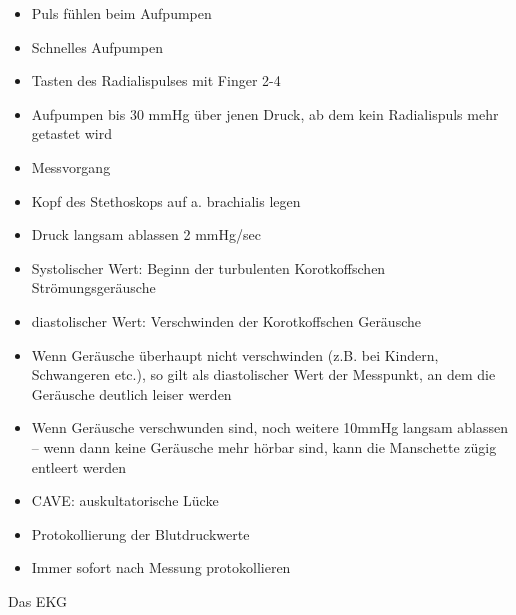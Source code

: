 \documentclass{article}
\begin{document}
\begin{itemize}
\item {\mdseries
Puls f\"uhlen beim Aufpumpen}

\end{itemize}
\begin{itemize}
\item {\mdseries
Schnelles Aufpumpen}

\item {\mdseries
Tasten des Radialispulses mit Finger 2-4}

\item {\mdseries
Aufpumpen bis 30 mmHg \"uber jenen Druck, ab dem kein Radialispuls mehr
getastet wird}

\end{itemize}
\begin{itemize}
\item {\mdseries
Messvorgang}

\end{itemize}
\begin{itemize}
\item {\mdseries
Kopf des Stethoskops auf a. brachialis legen}

\item {\mdseries
Druck langsam ablassen 2 mmHg/sec}

\item {\mdseries
Systolischer Wert: Beginn der turbulenten Korotkoffschen
Str\"omungsger\"ausche}

\item {\mdseries
diastolischer Wert: Verschwinden der Korotkoffschen Ger\"ausche}

\item {\mdseries
Wenn Ger\"ausche \"uberhaupt nicht verschwinden (z.B. bei Kindern,
Schwangeren etc.), so gilt als diastolischer Wert der Messpunkt, an dem
die Ger\"ausche deutlich leiser werden}

\item {\mdseries
Wenn Ger\"ausche verschwunden sind, noch weitere 10mmHg langsam ablassen
-- wenn dann keine Ger\"ausche mehr h\"orbar sind, kann die Manschette
z\"ugig entleert werden}

\item {\mdseries
CAVE: auskultatorische L\"ucke}

\end{itemize}
\begin{itemize}
\item {\mdseries
Protokollierung der Blutdruckwerte}

\end{itemize}
\begin{itemize}
\item {\mdseries
Immer sofort nach Messung protokollieren}

\end{itemize}
{\mdseries\color[rgb]{0.0,0.0,0.5019608}
Das EKG}
\end{document}
